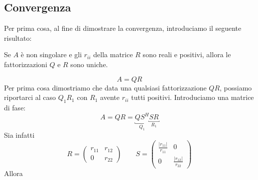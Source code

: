 \subsection{Convergenza}
Per prima cosa, al fine di dimostrare la convergenza,
introduciamo il seguente risultato:
\begin{theo}
Se $A$ \`e non singolare e gli $r_{ii}$ della matrice $R$ sono reali e positivi,
allora le fattorizzazioni $Q$ e $R$ sono uniche.
  \end{theo}
  \begin{thproof}
$$  A = QR $$
Per prima cosa dimostriamo che data una qualsiasi
fattorizzazione $QR$, possiamo riportarci al caso
$Q_1R_1$ con $R_1$ avente $r_{ii}$ tutti positivi.
Introduciamo una matrice di fase:
$$A = QR = \underbracket{Q S^{H}}_{Q_1} \underbracket{S R}_{R_1}$$
Sia infatti
$$
R =
\begin{pmatrix}
  r_{11}  & r_{12} \\
 0 & r_{22}
\end{pmatrix}
\qquad
S
=\begin{pmatrix}
 \frac{|r_{11}|}{r_{11}} & 0 \\
 0 & \frac{|r_{12}|}{r_{22}}
\end{pmatrix}
$$
Allora


\end{thproof}

